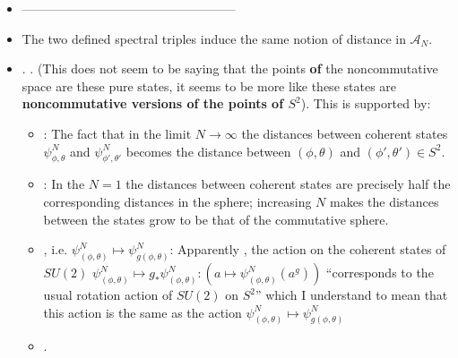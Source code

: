 \documentclass{article}
\begin{document}
\begin{itemize}
\begin{itemize}
        \end{itemize}
    
    \item ---------------------------------------------------
    
    \item The two defined spectral triples induce the same notion of distance in $\mathcal A_N$.
    
    \item {}. . (This does not seem to be saying that the points \textbf{of} the noncommutative space are these pure states, it seems to be more like these states are \textbf{noncommutative versions of the points of $S^2$}). This is supported by: 
    
        \begin{itemize}
        
        \item {}: The fact that in the limit $N \to \infty$ the distances between coherent states $\psi^N_{\phi, \theta}$ and $\psi^N_{\phi', \theta'}$ becomes the distance between $(\phi, \theta)$ and $(\phi', \theta') \in S^2$.
        
        \item {}: In the $N = 1$ the distances between coherent states are precisely half the corresponding distances in the sphere; increasing $N$ makes the distances between the states grow to be that of the commutative sphere.
        
        \item {}, i.e. $\psi^N_{(\phi, \theta)} \mapsto \psi^N_{g(\phi, \theta)}$: Apparently , the action on the coherent states of $SU(2)$ $\psi^N_{(\phi, \theta)} \mapsto g_*\psi^N_{(\phi, \theta)}:(a \mapsto \psi^N_{(\phi, \theta)}(a^g))$ ``corresponds to the usual rotation action of $SU(2)$ on $S^2$'' which I understand to mean that this action is the same as the action $\psi^N_{(\phi, \theta)} \mapsto \psi^N_{g(\phi, \theta)}$
        
        \item {}.
            
        \end{itemize}
    
    
    \end{itemize}
\end{document}
